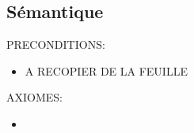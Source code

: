 \documentclass[a4paper, 11pt, oneside]{article}
\begin{document}
\subsection{Sémantique}

\noindent PRECONDITIONS:
\begin{itemize}
    \item A RECOPIER DE LA FEUILLE
\end{itemize}

\noindent AXIOMES:
\begin{itemize}
    \item 
\end{itemize}
\end{document}
